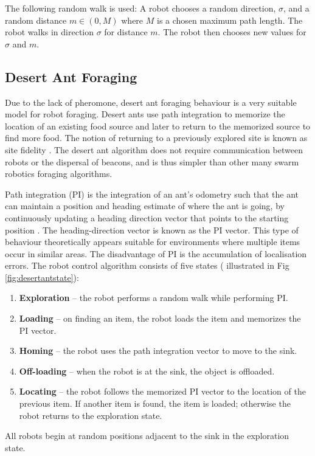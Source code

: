 The following random walk is used: A robot chooses a random direction, $\sigma$, and a random distance $m\in(0,M)$ where $M$ is a chosen maximum path length. The robot walks in direction $\sigma$ for distance $m$. The robot then chooses new values for $\sigma$ and $m$. 


\subsection{Desert Ant Foraging}

Due to the lack of pheromone, desert ant foraging behaviour is a very suitable model for robot foraging. Desert ants use path integration to memorize the location of an existing food source and later to return to the memorized source to find more food. The notion of returning to a previously explored site is known as site fidelity \cite{switzer1993site}. The desert ant algorithm does not require communication between robots or the dispersal of beacons, and is thus simpler than other many swarm robotics foraging algorithms. 

Path integration (PI) is the integration of an ant's odometry such that the ant can maintain a position and heading estimate of where the ant is going, by continuously updating a heading direction vector that points to the starting position \cite{ronacher2008path}. The heading-direction vector is known as the PI vector. This type of behaviour theoretically appears suitable for environments where multiple items occur in similar areas. The disadvantage of PI is the accumulation of localisation errors. The robot control algorithm consists of five states ( illustrated in Fig \ref{fig:desertantstate}):

\begin{enumerate}
	\item\textbf{Exploration} -- the robot performs a random walk while performing PI.
	\item\textbf{Loading} -- on finding an item, the robot loads the item and memorizes the PI vector.
	\item\textbf{Homing } -- the robot uses the path integration vector to move to the sink.
	\item\textbf{Off-loading} -- when the robot is at the sink, the object is offloaded.
	\item\textbf{Locating} -- the robot follows the memorized PI vector to the location of the previous item. If another item is found, the item is loaded; otherwise the robot returns to the exploration state. 
\end{enumerate}
All robots begin at random positions adjacent to the sink in the exploration state.

